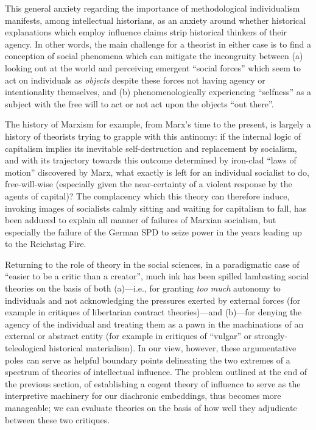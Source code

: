 \documentclass[11pt]{article}
\begin{document}
This general anxiety regarding the importance of methodological individualism manifests, among intellectual historians, as an anxiety around whether historical explanations which employ influence claims strip historical thinkers of their agency. In other words, the main challenge for a theorist in either case is to find a conception of social phenomena which can mitigate the incongruity between (a) looking out at the world and perceiving emergent ``social forces'' which seem to act on individuals as \textit{objects} despite these forces not having agency or intentionality themselves,
and (b) phenomenologically experiencing ``selfness'' as a subject with the free will to act or not act upon the objects ``out there''.

The history of Marxism for example, from Marx's time to the present, is largely a history of theorists trying to grapple with this antinomy: if the internal logic of capitalism implies its inevitable self-destruction and replacement by socialism, and with its trajectory towards this outcome determined by iron-clad ``laws of motion'' discovered by Marx, what exactly is left for an individual socialist to do, free-will-wise (especially given the near-certainty of a violent response by the agents of capital)? The complacency which this theory can therefore induce, invoking images of socialists calmly sitting and waiting for capitalism to fall, has been adduced to explain all manner of failures of Marxian socialism, but especially the failure of the German SPD to seize power in the years leading up to the Reichstag Fire.


Returning to the role of theory in the social sciences, in a paradigmatic case of ``easier to be a critic than a creator'', much ink has been spilled lambasting social theories on the basis of both (a)---i.e., for granting \textit{too much} autonomy to individuals and not acknowledging the pressures exerted by external forces (for example in critiques of libertarian contract theories)---and (b)---for denying the agency of the individual and treating them as a pawn in the machinations of an external or abstract entity (for example in critiques of ``vulgar'' or strongly-teleological historical materialism). In our view, however, these argumentative poles can serve as helpful boundary points delineating the two extremes of a spectrum of theories of intellectual influence. The problem outlined at the end of the previous section, of establishing a cogent theory of influence to serve as the interpretive machinery for our diachronic embeddings, thus becomes more manageable; we can evaluate theories on the basis of how well they adjudicate between these two critiques.
\end{document}
